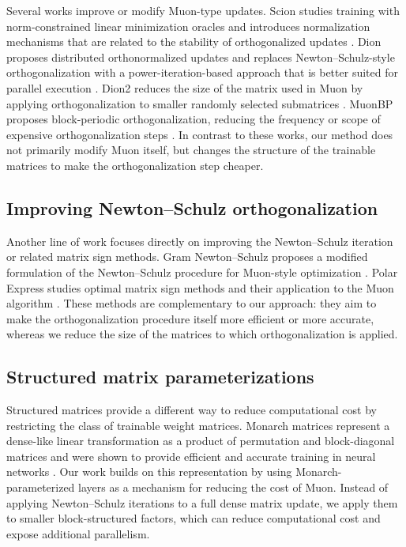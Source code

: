 \documentclass{article}
\begin{document}
Several works improve or modify Muon-type updates. Scion studies training with norm-constrained linear minimization oracles and introduces normalization mechanisms that are related to the stability of orthogonalized updates \cite{pethick2025trainingdeeplearningmodels}. Dion proposes distributed orthonormalized updates and replaces Newton--Schulz-style orthogonalization with a power-iteration-based approach that is better suited for parallel execution \cite{ahn2025diondistributedorthonormalizedupdates}. Dion2 reduces the size of the matrix used in Muon by applying orthogonalization to smaller randomly selected submatrices \cite{ahn2025dion2simplemethodshrink}. MuonBP proposes block-periodic orthogonalization, reducing the frequency or scope of expensive orthogonalization steps \cite{khaled2025muonbpfastermuonblockperiodic}. In contrast to these works, our method does not primarily modify Muon itself, but changes the structure of the trainable matrices to make the orthogonalization step cheaper.

\subsection{Improving Newton--Schulz orthogonalization}

Another line of work focuses directly on improving the Newton--Schulz iteration or related matrix sign methods. Gram Newton--Schulz proposes a modified formulation of the Newton--Schulz procedure for Muon-style optimization \cite{GramNewtonSchulz}. Polar Express studies optimal matrix sign methods and their application to the Muon algorithm \cite{amsel2026polarexpressoptimalmatrix}. These methods are complementary to our approach: they aim to make the orthogonalization procedure itself more efficient or more accurate, whereas we reduce the size of the matrices to which orthogonalization is applied.

\subsection{Structured matrix parameterizations}

Structured matrices provide a different way to reduce computational cost by restricting the class of trainable weight matrices. Monarch matrices represent a dense-like linear transformation as a product of permutation and block-diagonal matrices and were shown to provide efficient and accurate training in neural networks \cite{dao2022monarchexpressivestructuredmatrices}. Our work builds on this representation by using Monarch-parameterized layers as a mechanism for reducing the cost of Muon. Instead of applying Newton--Schulz iterations to a full dense matrix update, we apply them to smaller block-structured factors, which can reduce computational cost and expose additional parallelism.
\end{document}
